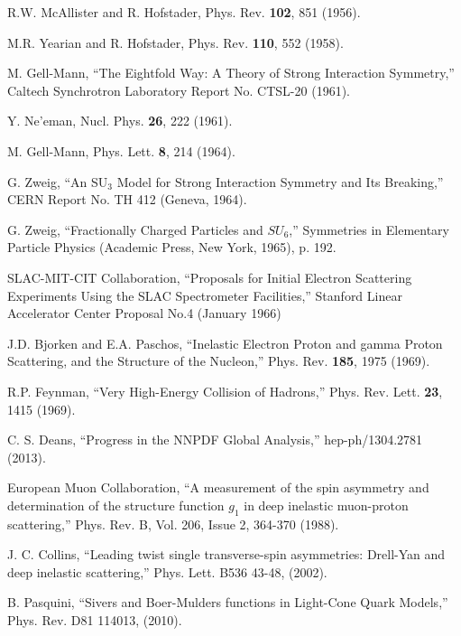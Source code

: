\begin{thebibliography}{99}

	R.W. McAllister and R. Hofstader,
	Phys. Rev. \textbf{102}, 851 (1956).

	M.R. Yearian and R. Hofstader,
	Phys. Rev. \textbf{110}, 552 (1958).

	M. Gell-Mann, ``The Eightfold Way: A Theory of Strong Interaction Symmetry,''
	Caltech Synchrotron Laboratory Report No. CTSL-20 (1961).

	Y. Ne'eman, 
	Nucl. Phys. \textbf{26}, 222 (1961).

	M. Gell-Mann,
	Phys. Lett. \textbf{8}, 214 (1964).

	G. Zweig, ``An SU$_{3}$ Model for Strong Interaction Symmetry and Its Breaking,''
	CERN Report No. TH 412 (Geneva, 1964).

	G. Zweig, ``Fractionally Charged Particles and $SU_{6}$,''
	Symmetries in Elementary Particle Physics (Academic Press, New York, 1965), p. 192.

	SLAC-MIT-CIT Collaboration, ``Proposals for Initial Electron Scattering Experiments Using the SLAC Spectrometer Facilities,''
	Stanford Linear Accelerator Center Proposal No.4 (January 1966)

	J.D. Bjorken and E.A. Paschos, ``Inelastic Electron Proton and gamma Proton Scattering, and the Structure of the Nucleon,''
	Phys. Rev. \textbf{185}, 1975 (1969).

	R.P. Feynman, ``Very High-Energy Collision of Hadrons,''
	Phys. Rev. Lett. \textbf{23}, 1415 (1969).

	C. S. Deans, ``Progress in the NNPDF Global Analysis,''
	hep-ph/1304.2781 (2013).

	European Muon Collaboration, ``A measurement of the spin asymmetry and determination of the structure function $g_1$ in 
        deep inelastic muon-proton scattering,''
	Phys. Rev. B, Vol. 206, Issue 2, 364-370 (1988).

	J. C. Collins, ``Leading twist single transverse-spin asymmetries: Drell-Yan and deep inelastic scattering,''
	Phys. Lett. B536 43-48, (2002).

	B. Pasquini, ``Sivers and Boer-Mulders functions in Light-Cone Quark Models,''
	Phys. Rev. D81 114013, (2010).


\end{thebibliography}
